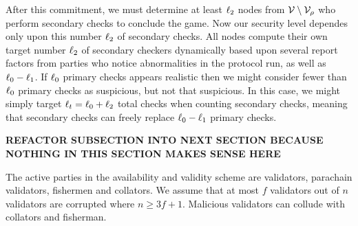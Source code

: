 After this commitment, we must determine at least $\ell_2$ nodes from $\mathcal{V} \setminus \mathcal{V}_{\rho}$ who perform secondary checks to conclude the game.  Now our security level dependes only upon this number $\ell_2$ of secondary checks.  
All nodes compute their own target number $\ell_2$ of secondary checkers dynamically based upon several report factors from parties who notice abnormalities in the protocol run, as well as $\ell_0-\ell_1$.  If $\ell_0$ primary checks appears realistic then we might consider fewer than $\ell_0$ primary checks as suspicious, but not that suspicious.  In this case, we might simply target $\ell_t = \ell_0 + \ell_2$ total checks when counting secondary checks, meaning that secondary checks can freely replace $\ell_0-\ell_1$ primary checks.  






{\bf REFACTOR SUBSECTION INTO NEXT SECTION BECAUSE NOTHING IN THIS SECTION MAKES SENSE HERE}



The active parties in the availability and validity scheme are validators, parachain validators, fishermen and collators. We assume that at most $ f $ validators out of $ n $ validators are corrupted where $n \geq 3f+1$. Malicious validators can collude with collators and fisherman. 







